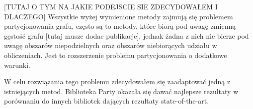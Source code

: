 [TUTAJ O TYM NA JAKIE PODEJSCIE SIE ZDECYDOWAŁEM I DLACZEGO]
\newline[WSTĘP]
Wszystkie wyżej wymienione metody zajmują się problemem partycjonowania grafu, często są to metody, które biorą
pod uwagę zmienną gęstość grafu [tutaj musze dodac publikacje], jednak żadna z nich
nie bierze pod uwagę obszarów niepodzielnych oraz obszarów niebiorących udziału w obliczeniach.
Jest to rozszerzenie problemu partycjonowania o dodatkowe warunki.

W celu rozwiązania tego problemu zdecydowałem się zaadaptować jedną z istniejących metod.
Biblioteka Party \cite{1364754} okazała się dawać najlepsze rezultaty w porównaniu do innych bibliotek dających rezultaty
state-of-the-art.



